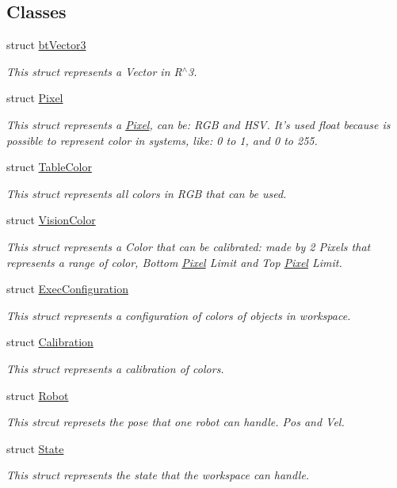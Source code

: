 \subsection*{Classes}
\begin{DoxyCompactItemize}
\item 
struct \hyperlink{structcommon_1_1btVector3}{bt\-Vector3}
\begin{DoxyCompactList}\small\item\em This struct represents a Vector in R$^\wedge$3. \end{DoxyCompactList}\item 
struct \hyperlink{structcommon_1_1Pixel}{Pixel}
\begin{DoxyCompactList}\small\item\em This struct represents a \hyperlink{structcommon_1_1Pixel}{Pixel}, can be\-: R\-G\-B and H\-S\-V. It's used float because is possible to represent color in systems, like\-: 0 to 1, and 0 to 255. \end{DoxyCompactList}\item 
struct \hyperlink{structcommon_1_1TableColor}{Table\-Color}
\begin{DoxyCompactList}\small\item\em This struct represents all colors in R\-G\-B that can be used. \end{DoxyCompactList}\item 
struct \hyperlink{structcommon_1_1VisionColor}{Vision\-Color}
\begin{DoxyCompactList}\small\item\em This struct represents a Color that can be calibrated\-: made by 2 Pixels that represents a range of color, Bottom \hyperlink{structcommon_1_1Pixel}{Pixel} Limit and Top \hyperlink{structcommon_1_1Pixel}{Pixel} Limit. \end{DoxyCompactList}\item 
struct \hyperlink{structcommon_1_1ExecConfiguration}{Exec\-Configuration}
\begin{DoxyCompactList}\small\item\em This struct represents a configuration of colors of objects in workspace. \end{DoxyCompactList}\item 
struct \hyperlink{structcommon_1_1Calibration}{Calibration}
\begin{DoxyCompactList}\small\item\em This struct represents a calibration of colors. \end{DoxyCompactList}\item 
struct \hyperlink{structcommon_1_1Robot}{Robot}
\begin{DoxyCompactList}\small\item\em This strcut represets the pose that one robot can handle. Pos and Vel. \end{DoxyCompactList}\item 
struct \hyperlink{structcommon_1_1State}{State}
\begin{DoxyCompactList}\small\item\em This struct represents the state that the workspace can handle. \end{DoxyCompactList}\end{DoxyCompactItemize}
